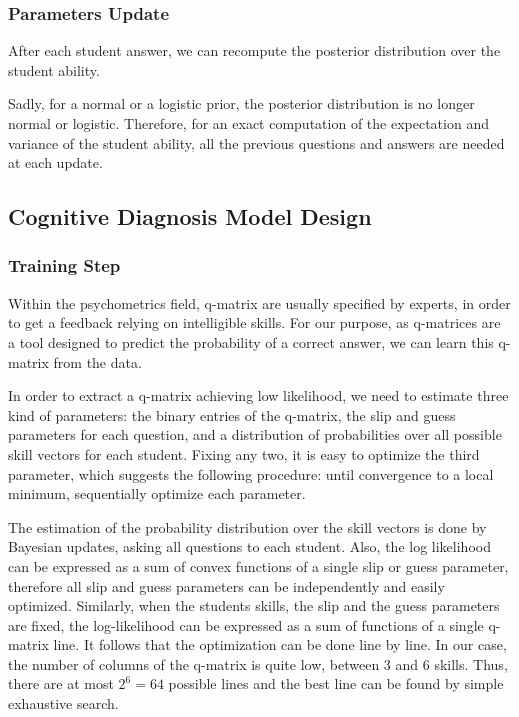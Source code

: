 \documentclass{sig-alternate}
\begin{document}
\subsubsection{Parameters Update}

After each student answer, we can recompute the posterior distribution over the student ability.

Sadly, for a normal or a logistic prior, the posterior distribution is no longer normal or logistic. Therefore, for an exact computation of the expectation and variance of the student ability, all the previous questions and answers are needed at each update.

\subsection{Cognitive Diagnosis Model Design}

\subsubsection{Training Step}

Within the psychometrics field, q-matrix are usually specified by experts, in order to get a feedback relying on intelligible skills. For our purpose, as q-matrices are a tool designed to predict the probability of a correct answer, we can learn this q-matrix from the data.

In order to extract a q-matrix achieving low likelihood, we need to estimate three kind of parameters: the binary entries of the q-matrix, the slip and guess parameters for each question, and a distribution of probabilities over all possible skill vectors for each student. Fixing any two, it is easy to optimize the third parameter, which suggests the following procedure: until convergence to a local minimum, sequentially optimize each parameter.

The estimation of the probability distribution over the skill vectors is done by Bayesian updates, asking all questions to each student. Also, the log likelihood can be expressed as a sum of convex functions of a single slip or guess parameter, therefore all slip and guess parameters can be independently and easily optimized.  Similarly, when the students skills, the slip and the guess parameters are fixed, the log-likelihood can be expressed as a sum of functions of a single q-matrix line. It follows that the optimization can be done line by line. In our case, the number of columns of the q-matrix is quite low, between 3 and 6 skills. Thus, there are at most $2^6 = 64$ possible lines and the best line can be found by simple exhaustive search.
\end{document}
